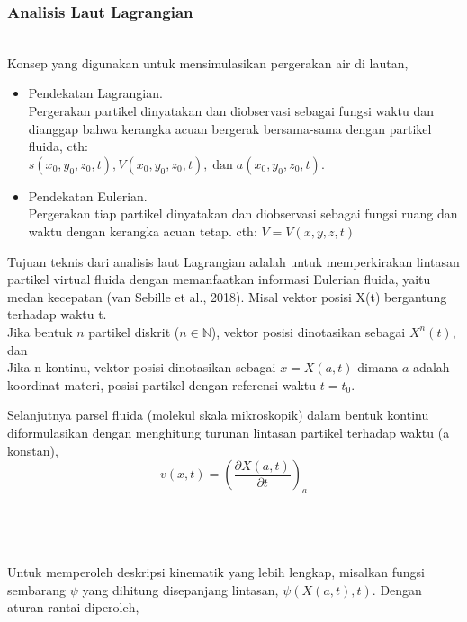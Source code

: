 \documentclass{beamer}
\begin{document}
\begin{frame}[allowframebreaks]
	\frametitle{Analisis Laut Lagrangian}
		$\;$ \\
	Konsep yang digunakan untuk mensimulasikan
	pergerakan air di lautan,
	\begin{itemize}
		\item Pendekatan Lagrangian. \\ \vspace{.5pt}
		\tiny Pergerakan partikel dinyatakan dan diobservasi sebagai fungsi waktu dan dianggap bahwa kerangka acuan bergerak bersama-sama dengan partikel fluida, cth: \\ \vspace{-5.5pt} $s(x_0,y_0,z_0,t), V(x_0,y_0,z_0,t), \;\text{dan}\; a(x_0,y_0,z_0,t)$. \normalsize
		\item Pendekatan Eulerian. \\
		\tiny Pergerakan tiap partikel dinyatakan dan diobservasi sebagai fungsi ruang dan waktu dengan kerangka acuan tetap. cth:
		$V = V(x,y,z,t)$
	\end{itemize}
	Tujuan teknis dari analisis laut Lagrangian adalah untuk memperkirakan lintasan partikel virtual fluida dengan memanfaatkan informasi Eulerian fluida, yaitu medan kecepatan (van Sebille et al., 2018). \newpage
	Misal vektor posisi X(t) bergantung terhadap waktu t. \\
	Jika bentuk $n$ partikel diskrit ($n \in \mathbb{N}$), vektor posisi dinotasikan sebagai $X^n(t)$, dan \\
	Jika n kontinu, vektor posisi dinotasikan sebagai $x=X(a,t)$ dimana $a$ adalah koordinat materi, posisi partikel dengan referensi waktu $t=t_0$. \\
	\vspace{5.5pt}
	\par Selanjutnya parsel fluida (molekul skala mikroskopik) dalam bentuk kontinu diformulasikan dengan menghitung turunan lintasan partikel terhadap waktu (a konstan), 
	\begin{equation}\label{eq:basic_traj}
		v(x,t) = \left(\frac{\partial X(a,t)}{\partial t}\right)_a
	\end{equation}
	$\;$ \\
	$\;$ \\
	$\;$ \\
	$\;$ \\
	Untuk memperoleh deskripsi kinematik yang lebih lengkap, misalkan fungsi sembarang $\psi$ yang dihitung disepanjang lintasan, $\psi(X(a,t),t)$. Dengan aturan rantai diperoleh,
	\begin{equation*}

\end{equation*}
\end{frame}
\end{document}
